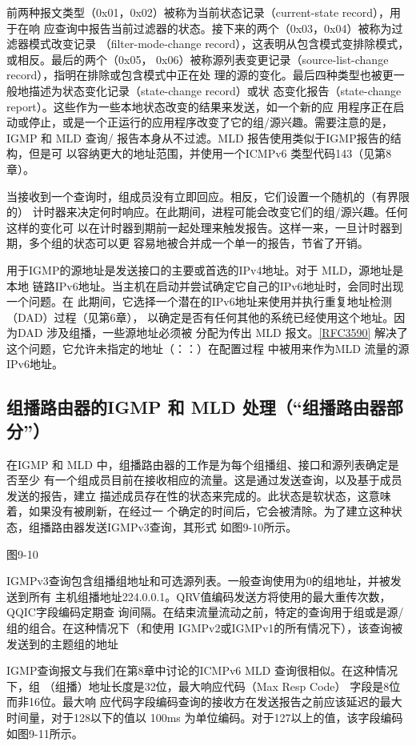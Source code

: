 前两种报文类型（0x01，0x02）被称为当前状态记录（current-state record），用于在响
应查询中报告当前过滤器的状态。接下来的两个（0x03，0x04）被称为过滤器模式改变记录
（filter-mode-change record），这表明从包含模式变排除模式，或相反。最后的两个（0x05，
0x06）被称源列表变更记录（source-list-change record），指明在排除或包含模式中正在处
理的源的变化。最后四种类型也被更一般地描述为状态变化记录（state-change record）或状
态变化报告（state-change report）。这些作为一些本地状态改变的结果来发送，如一个新的应
用程序正在启动或停止，或是一个正运行的应用程序改变了它的组/源兴趣。需要注意的是，
IGMP 和 MLD 查询/ 报告本身从不过滤。MLD 报告使用类似于IGMP报告的结构，但是可
以容纳更大的地址范围，并使用一个ICMPv6 类型代码143（见第8章）。

当接收到一个查询时，组成员没有立即回应。相反，它们设置一个随机的（有界限的）
计时器来决定何时响应。在此期间，进程可能会改变它们的组/源兴趣。任何这样的变化可
以在计时器到期前一起处理来触发报告。这样一来，一旦计时器到期，多个组的状态可以更
容易地被合并成一个单一的报告，节省了开销。

用于IGMP的源地址是发送接口的主要或首选的IPv4地址。对于 MLD，源地址是本地
链路IPv6地址。当主机在启动并尝试确定它自己的IPv6地址时，会同时出现一个问题。在
此期间，它选择一个潜在的IPv6地址来使用并执行重复地址检测（DAD）过程（见第6章），
以确定是否有任何其他的系统已经使用这个地址。因为DAD 涉及组播，一些源地址必须被
分配为传出 MLD 报文。\href{https://www.rfc-editor.org/rfc/rfc3590}{[RFC3590]} 解决了这个问题，它允许未指定的地址（：：）在配置过程
中被用来作为MLD 流量的源IPv6地址。

\subsection{组播路由器的IGMP 和 MLD 处理（“组播路由器部分”）}
在IGMP 和 MLD 中，组播路由器的工作是为每个组播组、接口和源列表确定是否至少
有一个组成员目前在接收相应的流量。这是通过发送查询，以及基于成员发送的报告，建立
描述成员存在性的状态来完成的。此状态是软状态，这意味着，如果没有被刷新，在经过一
个确定的时间后，它会被清除。为了建立这种状态，组播路由器发送IGMPv3查询，其形式
如图9-10所示。

图9-10

IGMPv3查询包含组播组地址和可选源列表。一般查询使用为0的组地址，并被发送到所有
主机组播地址224.0.0.1。QRV值编码发送方将使用的最大重传次数，QQIC字段编码定期查
询间隔。在结束流量流动之前，特定的查询用于组或是源/组的组合。在这种情况下（和使用
IGMPv2或IGMPv1的所有情况下），该查询被发送到的主题组的地址

IGMP查询报文与我们在第8章中讨论的ICMPv6 MLD 查询很相似。在这种情况下，组
（组播）地址长度是32位，最大响应代码（Max Resp Code） 字段是8位而非16位。最大响
应代码字段编码查询的接收方在发送报告之前应该延迟的最大时间量，对于128以下的值以
100ms 为单位编码。对于127以上的值，该字段编码如图9-11所示。

